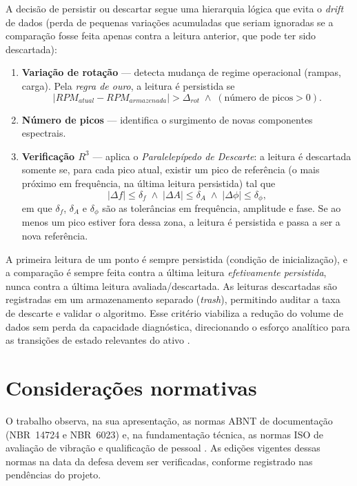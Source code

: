 A decisão de persistir ou descartar segue uma hierarquia lógica que evita o
\emph{drift} de dados (perda de pequenas variações acumuladas que seriam
ignoradas se a comparação fosse feita apenas contra a leitura anterior, que pode
ter sido descartada):

\begin{enumerate}
  \item \textbf{Variação de rotação} --- detecta mudança de regime operacional
  (rampas, carga). Pela \emph{regra de ouro}, a leitura é persistida se
  \begin{equation}
  \label{eq:regra-ouro}
    \left|RPM_{atual} - RPM_{armazenada}\right| > \Delta_{rot}
    \;\wedge\; (\text{número de picos} > 0).
  \end{equation}
  \item \textbf{Número de picos} --- identifica o surgimento de novas
  componentes espectrais.
  \item \textbf{Verificação \(R^3\)} --- aplica o \emph{Paralelepípedo de
  Descarte}: a leitura é descartada somente se, para cada pico atual, existir um
  pico de referência (o mais próximo em frequência, na última leitura
  persistida) tal que
  \begin{equation}
  \label{eq:descarte}
    |\Delta f| \le \delta_f \;\wedge\; |\Delta A| \le \delta_A
    \;\wedge\; |\Delta \phi| \le \delta_\phi,
  \end{equation}
  em que \(\delta_f\), \(\delta_A\) e \(\delta_\phi\) são as tolerâncias em
  frequência, amplitude e fase. Se ao menos um pico estiver fora dessa zona, a
  leitura é persistida e passa a ser a nova referência.
\end{enumerate}

A primeira leitura de um ponto é sempre persistida (condição de inicialização),
e a comparação é sempre feita contra a última leitura \emph{efetivamente
persistida}, nunca contra a última leitura avaliada/descartada. As leituras
descartadas são registradas em um armazenamento separado (\emph{trash}),
permitindo auditar a taxa de descarte e validar o algoritmo. Esse critério
viabiliza a redução do volume de dados sem perda da capacidade diagnóstica,
direcionando o esforço analítico para as transições de estado relevantes do
ativo \cite{scheffer2004}.

\section{Considerações normativas}

O trabalho observa, na sua apresentação, as normas ABNT de documentação
(NBR~14724 e NBR~6023) \cite{abnt14724,abnt6023} e, na fundamentação técnica,
as normas ISO de avaliação de vibração e qualificação de pessoal
\cite{iso10816,iso18436}. As edições vigentes dessas normas na data da defesa
devem ser verificadas, conforme registrado nas pendências do projeto.
